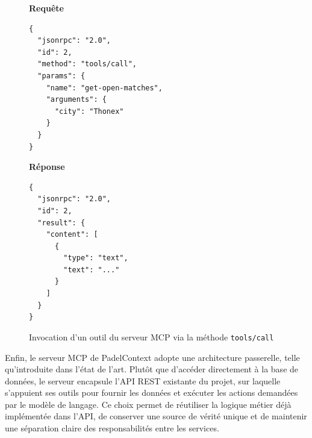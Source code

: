 \documentclass[12pt]{article}
\begin{document}
\begin{figure}[H]
\textbf{Requête}
\begin{lstlisting}[style=jsonstyle]
{
  "jsonrpc": "2.0",
  "id": 2,
  "method": "tools/call",
  "params": {
    "name": "get-open-matches",
    "arguments": {
      "city": "Thonex"
    }
  }
}
\end{lstlisting}
\textbf{Réponse}
\begin{lstlisting}[style=jsonstyle]
{
  "jsonrpc": "2.0",
  "id": 2,
  "result": {
    "content": [
      {
        "type": "text",
        "text": "..."
      }
    ]
  }
}
\end{lstlisting}
\caption{Invocation d'un outil du serveur MCP via la méthode \texttt{tools/call}}
\label{lst:jsonrpc_tools_call}
\end{figure}
Enfin, le serveur MCP de PadelContext adopte une architecture passerelle, telle qu'introduite dans l'état de l'art. Plutôt que d'accéder directement à la base de données, le serveur encapsule l'API REST existante du projet, sur laquelle s'appuient ses outils pour fournir les données et exécuter les actions demandées par le modèle de langage. Ce choix permet de réutiliser la logique métier déjà implémentée dans l'API, de conserver une source de vérité unique et de maintenir une séparation claire des responsabilités entre les services.
\end{document}
